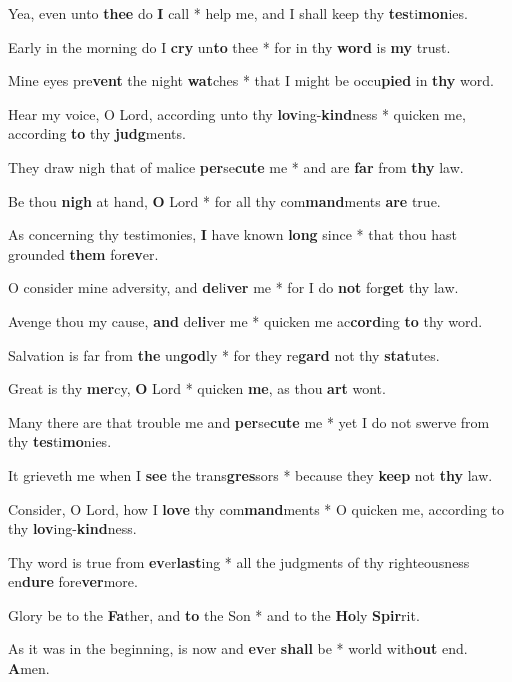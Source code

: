 \begin{multicols}{2}
	Yea, even unto \textbf{thee} do \textbf{I} call * help me, and I shall keep thy \textbf{tes}ti\textbf{mon}ies.
	
	Early in the morning do I \textbf{cry} un\textbf{to} thee * for in thy \textbf{word} is \textbf{my} trust.
	
	Mine eyes pre\textbf{vent} the night \textbf{wat}ches * that I might be occu\textbf{pied} in \textbf{thy} word.
	
	Hear my voice, O Lord, according unto thy \textbf{lov}ing-\textbf{kind}ness * quicken me, according \textbf{to} thy \textbf{judg}ments.
	
	They draw nigh that of malice \textbf{per}se\textbf{cute} me * and are \textbf{far} from \textbf{thy} law.
	
	Be thou \textbf{nigh} at hand, \textbf{O} Lord * for all thy com\textbf{mand}ments \textbf{are} true.
	
	As concerning thy testimonies, \textbf{I} have known \textbf{long} since * that thou hast grounded \textbf{them} for\textbf{ev}er.
	
	O consider mine adversity, and \textbf{de}li\textbf{ver} me * for I do \textbf{not} for\textbf{get} thy law.
	
	Avenge thou my cause, \textbf{and} de\textbf{li}ver me * quicken me ac\textbf{cord}ing \textbf{to} thy word.
	
	Salvation is far from \textbf{the} un\textbf{god}ly * for they re\textbf{gard} not thy \textbf{stat}utes.
	
	Great is thy \textbf{mer}cy, \textbf{O} Lord * quicken \textbf{me}, as thou \textbf{art} wont.
	
	Many there are that trouble me and \textbf{per}se\textbf{cute} me * yet I do not swerve from thy \textbf{tes}ti\textbf{mo}nies.
	
	It grieveth me when I \textbf{see} the trans\textbf{gres}sors * because they \textbf{keep} not \textbf{thy} law.
	
	Consider, O Lord, how I \textbf{love} thy com\textbf{mand}ments * O quicken me, according to thy \textbf{lov}ing-\textbf{kind}ness.
	
	Thy word is true from \textbf{ev}er\textbf{last}ing * all the judgments of thy righteousness en\textbf{dure} fore\textbf{ver}more.
	
	Glory be to the \textbf{Fa}ther, and \textbf{to} the Son * and to the \textbf{Ho}ly \textbf{Spir}rit.
	
	As it was in the beginning, is now and \textbf{ev}er \textbf{shall} be * world with\textbf{out} end. \textbf{A}men.
\end{multicols}